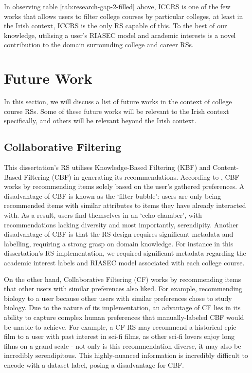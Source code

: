In observing table \ref{tab:research-gap-2-filled} above,
ICCRS is one of the few works that allows users to filter college courses by particular colleges,
at least in the Irish context, ICCRS is the only RS capable of this.
To the best of our knowledge, utilising a user's RIASEC model and academic interests is a novel 
contribution to the domain surrounding college and career RSs.

\section{Future Work}
\label{sec:future-work}

In this section, we will discuss a list of future works in the context of college course RSs.
Some of these future works will be relevant to the Irish context specifically, and
others will be relevant beyond the Irish context.

\subsection{Collaborative Filtering}

This dissertation's RS utilises Knowledge-Based Filtering (KBF) and Content-Based Filtering (CBF) in generating its recommendations.
According to \cite{aggarwal2016recommender}, CBF works by recommending items solely based on the user's gathered preferences.
A disadvantage of CBF is known as the `filter bubble': 
users are only being recommended items with similar attributes to items they have already interacted with.
As a result, users find themselves in an `echo chamber', with recommendations lacking diversity and most importantly,
serendipity.
Another disadvantage of CBF is that the RS design requires significant metadata and labelling,
requiring a strong grasp on domain knowledge.
For instance in this dissertation's RS implementation, we required significant metadata regarding the academic interest
labels and RIASEC model associated with each college course.

On the other hand, Collaborative Filtering (CF) works by recommending items that other users with similar preferences also liked.
For example, recommending biology to a user because other users with similar preferences chose to study biology.
Due to the nature of its implementation, an advantage of CF lies in its ability to capture complex human preferences
that manually-labeled CBF would be unable to achieve.
For example, a CF RS may recommend a historical epic film to a user with past interest in sci-fi films,
as other sci-fi lovers enjoy long films on a grand scale - not only is this recommendation diverse, it may also be incredibly serendipitous.
This highly-nuanced information is incredibly difficult to encode with a dataset label,
posing a disadvantage for CBF.

